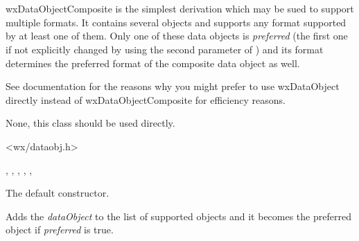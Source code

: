 
\section{}\label{wxdataobjectcomposite}

wxDataObjectComposite is the simplest 
 derivation which may be sued to support
multiple formats. It contains several 
 objects and supports any
format supported by at least one of them. Only one of these data objects is
{\it preferred} (the first one if not explicitly changed by using the second
parameter of ) and its format determines
the preferred format of the composite data object as well.

See  documentation for the reasons why you
might prefer to use wxDataObject directly instead of wxDataObjectComposite for
efficiency reasons.


None, this class should be used directly.




<wx/dataobj.h>


, 
, 
, 
, 
, 


\label{wxdataobjectcompositewxdataobjectcomposite}


The default constructor.

\label{wxdataobjectcompositeadd}


Adds the {\it dataObject} to the list of supported objects and it becomes the
preferred object if {\it preferred} is true.


